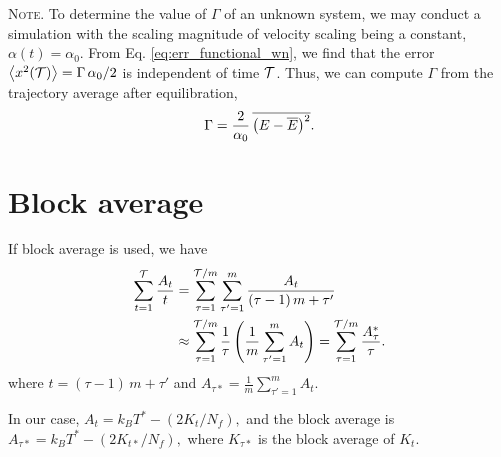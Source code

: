 \documentclass[reprint]{revtex4-1}
\newcommand{\note}[1]{{\color{DarkGreen}\footnotesize \textsc{Note.} #1}}
\begin{document}
\note{
  To determine the value of $\Gamma$ of an unknown system,
  we may conduct a simulation
  with the scaling magnitude of velocity scaling
  being a constant, $\alpha(t) = \alpha_0$.
  From Eq. \eqref{eq:err_functional_wn}, we find that
  the error
  $\left\langle
    x^2(\mathcal T)
  \right\rangle
  =
  \Gamma \, \alpha_0 / 2$
  is independent of time $\mathcal T$.
  Thus, we can compute $\Gamma$ from the trajectory average
  after equilibration,
  \begin{equation}
  \Gamma
  =
  \frac{ 2 } { \alpha_0 } \,
  \overline{
    \bigl(
      E - \overline E
    \bigr)^2
  }
  .
  \notag
  \end{equation}
}






\section{\label{sec:block}
Block average}



If block average is used, we have
%
\begin{align*}
  \sum_{t = 1}^{\mathcal T} \frac{ A_t } { t }
  &=
  \sum_{\tau = 1}^{\mathcal T/m}
  \sum_{\tau' = 1}^{m}
  \frac{ A_t } { (\tau - 1) \, m + \tau' }
  \\
  &\approx
  \sum_{\tau = 1}^{\mathcal T/m}
  \frac{ 1 } { \tau }
  \left(
    \frac 1 m
    \sum_{\tau' = 1}^m
    A_t
  \right)
  =
  \sum_{\tau = 1}^{\mathcal T/m}
  \frac{ A^*_\tau } { \tau }
  .
\end{align*}
%
where
$t = (\tau - 1) \, m + \tau'$
and
$
A_{\tau*} = \frac 1 m
\sum_{\tau' = 1}^m A_t.
$

In our case,
$
A_t = k_B T^* - \left( 2 K_t / N_f\right),
$
and the block average is
$
A_{\tau*}
= k_B T^* - \left( 2 K_{t*} / N_f\right),
$
where $K_{\tau*}$
is the block average of $K_t$.

%

\end{document}
